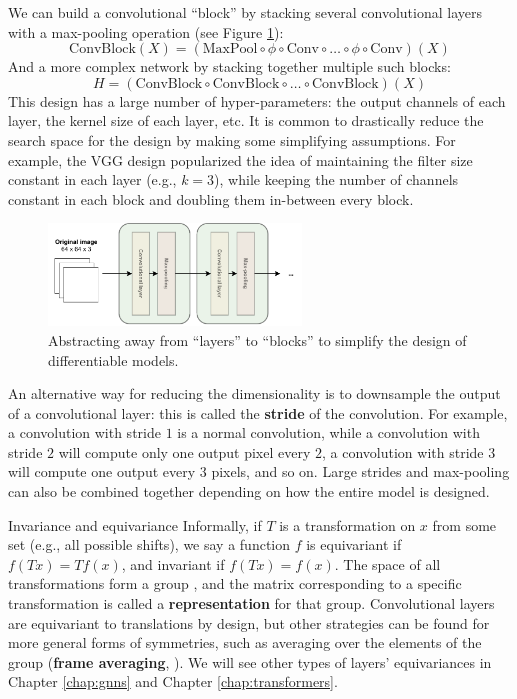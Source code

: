 We can build a convolutional “block” by stacking several convolutional layers with a max-pooling operation  (see Figure \ref{fig:cnn_blocks}):
%
$$
\text{ConvBlock}(X)= (\text{MaxPool} \circ \phi \circ \text{Conv}\circ\ldots\circ\phi\circ\text{Conv})(X)
$$
%
And a more complex network by stacking together multiple such blocks:
%
\begin{equation}
H = (\text{ConvBlock}\circ\text{ConvBlock}\circ\ldots\circ\text{ConvBlock})(X)
\label{eq:convolutive_backbone}
\end{equation}
%
This design has a large number of hyper-parameters: the output channels of each layer, the kernel size of each layer, etc. It is common to drastically reduce the search space for the design by making some simplifying assumptions. For example, the VGG design \cite{szegedy2015going} popularized the idea of maintaining the filter size constant in each layer (e.g., $k=3$), while keeping the number of channels constant in each block and doubling them in-between every block.

\begin{figure}
    \centering
    \hspace{1em}\includegraphics[width=0.6\textwidth]{images/CNN_blocks}
    \caption{Abstracting away from “layers” to “blocks” to simplify the design of differentiable models.}
    \label{fig:cnn_blocks}
\end{figure}

An alternative way for reducing the dimensionality is to downsample the output of a convolutional layer: this is called the \textbf{stride} of the convolution. For example, a convolution with stride $1$ is a normal convolution, while a convolution with stride $2$ will compute only one output pixel every $2$, a convolution with stride $3$ will compute one output every $3$ pixels, and so on. Large strides and max-pooling can also be combined together depending on how the entire model is designed.

\begin{supportbox}{Invariance and equivariance}
Informally, if $T$ is a transformation on $x$ from some set (e.g., all possible shifts), we say a function $f$ is equivariant if $f(Tx)=Tf(x)$, and invariant if $f(Tx)=f(x)$. The space of all transformations form a group \cite{bronstein2017geometric}, and the matrix corresponding to a specific transformation is called a \textbf{representation} for that group. Convolutional layers are equivariant to translations by design, but other strategies can be found for more general forms of symmetries, such as averaging over the elements of the group (\textbf{frame averaging}, \cite{puny2021frame}). We will see other types of layers' equivariances in Chapter \ref{chap:gnns} and Chapter \ref{chap:transformers}.
\end{supportbox}

